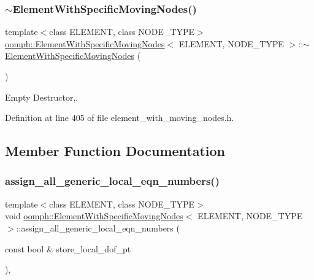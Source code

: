 \subsubsection{\texorpdfstring{$\sim$\+Element\+With\+Specific\+Moving\+Nodes()}{~ElementWithSpecificMovingNodes()}}
{\footnotesize\ttfamily template$<$class E\+L\+E\+M\+E\+NT, class N\+O\+D\+E\+\_\+\+T\+Y\+PE$>$ \\
\hyperlink{classoomph_1_1ElementWithSpecificMovingNodes}{oomph\+::\+Element\+With\+Specific\+Moving\+Nodes}$<$ E\+L\+E\+M\+E\+NT, N\+O\+D\+E\+\_\+\+T\+Y\+PE $>$\+::$\sim$\hyperlink{classoomph_1_1ElementWithSpecificMovingNodes}{Element\+With\+Specific\+Moving\+Nodes} (\begin{DoxyParamCaption}{ }\end{DoxyParamCaption})\hspace{0.3cm}{\ttfamily [inline]}}



Empty Destructor,. 



Definition at line 405 of file element\+\_\+with\+\_\+moving\+\_\+nodes.\+h.



\subsection{Member Function Documentation}
\mbox{\label{classoomph_1_1ElementWithSpecificMovingNodes_a82531e83f80254735130558f0562cdff}} 
\subsubsection{\texorpdfstring{assign\+\_\+all\+\_\+generic\+\_\+local\+\_\+eqn\+\_\+numbers()}{assign\_all\_generic\_local\_eqn\_numbers()}}
{\footnotesize\ttfamily template$<$class E\+L\+E\+M\+E\+NT, class N\+O\+D\+E\+\_\+\+T\+Y\+PE$>$ \\
void \hyperlink{classoomph_1_1ElementWithSpecificMovingNodes}{oomph\+::\+Element\+With\+Specific\+Moving\+Nodes}$<$ E\+L\+E\+M\+E\+NT, N\+O\+D\+E\+\_\+\+T\+Y\+PE $>$\+::assign\+\_\+all\+\_\+generic\+\_\+local\+\_\+eqn\+\_\+numbers (\begin{DoxyParamCaption}\item[{const bool \&}]{store\+\_\+local\+\_\+dof\+\_\+pt }\end{DoxyParamCaption})\hspace{0.3cm}{\ttfamily [inline]}, {\ttfamily [virtual]}}



